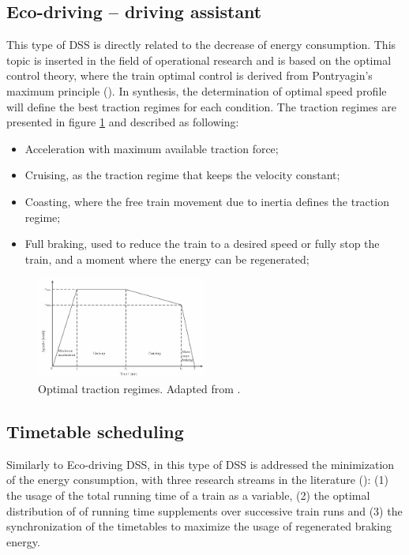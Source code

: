 \subsection{Eco-driving – driving assistant}
\label{subs:352}

	This type of DSS is directly related to the decrease of energy consumption. This topic is inserted in the field of operational research and is based on the optimal control theory, where the train optimal control is derived from Pontryagin's maximum principle (\cite{pontryagin1963}).  
	In synthesis, the determination of optimal speed profile will define the best traction regimes for each condition. The traction regimes are presented in figure \ref{fig:scheepmaker2017a} and described as following:
	
	\begin{itemize}
		\setlength\itemsep{-0.5em}
		\item Acceleration with maximum available traction force;
		\item Cruising, as the traction regime that keeps the velocity constant;
		\item Coasting, where the free train movement due to inertia defines the traction regime;
		\item Full braking, used to reduce the train to a desired speed or fully stop the train, and a moment where the energy can be regenerated;
	\end{itemize}
	
	\begin{figure}[h!]
		\centering
		\includegraphics[width=0.5\textwidth,keepaspectratio]{figures/35.DSS/scheepmaker2017a}
		\caption{Optimal traction regimes. Adapted from \cite{scheepmaker2017}.}
		\label{fig:scheepmaker2017a}
	\end{figure}
	
	

\subsection{Timetable scheduling}
\label{subs:353}

	Similarly to Eco-driving DSS, in this type of DSS is addressed the minimization of the energy consumption, with three research streams in the literature (\cite{scheepmaker2017}): (1) the usage of the total running time of a train as a variable, (2) the optimal distribution of of running time supplements over successive train runs and (3) the synchronization of the timetables to maximize the usage of regenerated braking energy.
	
	
	
